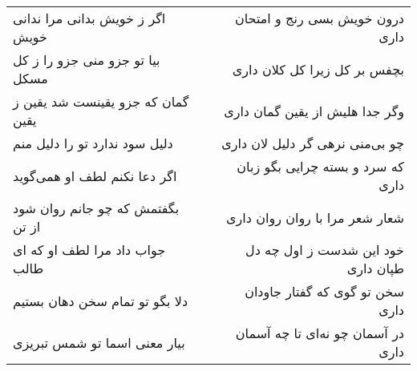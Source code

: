 \begin{center}
\begin{longtable}{l p{0.5cm} r}
اگر ز خویش بدانی مرا ندانی خویش
&&
درون خویش بسی رنج و امتحان داری
\\
بیا تو جزو منی جزو را ز کل مسکل
&&
بچفس بر کل زیرا کل کلان داری
\\
گمان که جزو یقینست شد یقین ز یقین
&&
وگر جدا هلیش از یقین گمان داری
\\
دلیل سود ندارد تو را دلیل منم
&&
چو بی‌منی نرهی گر دلیل لان داری
\\
اگر دعا نکنم لطف او همی‌گوید
&&
که سرد و بسته چرایی بگو زبان داری
\\
بگفتمش که چو جانم روان شود از تن
&&
شعار شعر مرا با روان روان داری
\\
جواب داد مرا لطف او که ای طالب
&&
خود این شدست ز اول چه دل طپان داری
\\
دلا بگو تو تمام سخن دهان بستیم
&&
سخن تو گوی که گفتار جاودان داری
\\
بیار معنی اسما تو شمس تبریزی
&&
در آسمان چو نه‌ای تا چه آسمان داری
\\
\end{longtable}
\end{center}
